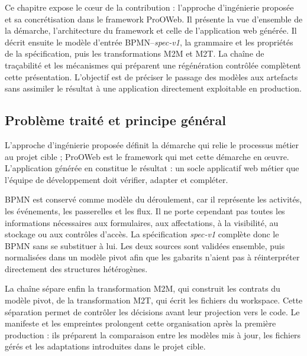 ﻿%
\label{chap:framework-prooweb}


Ce chapitre expose le cœur de la contribution : l'approche d'ingénierie proposée
et sa concrétisation dans le framework ProOWeb. Il présente la vue d'ensemble de
la démarche, l'architecture du framework et celle de l'application web générée.
Il décrit ensuite le modèle d'entrée BPMN--\textit{spec-v1}, la grammaire et les
propriétés de la spécification, puis les transformations M2M et M2T. La chaîne de
traçabilité et les mécanismes qui préparent une régénération contrôlée complètent
cette présentation. L'objectif est de préciser le passage des modèles aux
artefacts sans assimiler le résultat à une application directement exploitable
en production.

\label{sec:chap3-vue-ensemble}

\subsection{Problème traité et principe général}

L'approche d'ingénierie proposée définit la démarche qui relie le processus
métier au projet cible ; ProOWeb est le framework qui met cette démarche en
œuvre. L'application générée en constitue le résultat : un socle applicatif web
métier que l'équipe de développement doit vérifier, adapter et compléter.

BPMN est conservé comme modèle du déroulement, car il représente les activités,
les événements, les passerelles et les flux. Il ne porte cependant pas toutes
les informations nécessaires aux formulaires, aux affectations, à la visibilité,
au stockage ou aux contrôles d'accès. La spécification \textit{spec-v1} complète
donc le BPMN sans se substituer à lui. Les deux sources sont validées ensemble,
puis normalisées dans un modèle pivot afin que les gabarits n'aient pas à
réinterpréter directement des structures hétérogènes.

La chaîne sépare enfin la transformation M2M, qui construit les contrats du
modèle pivot, de la transformation M2T, qui écrit les fichiers du workspace.
Cette séparation permet de contrôler les décisions avant leur projection vers
le code. Le manifeste et les empreintes prolongent cette organisation après la
première production : ils préparent la comparaison entre les modèles mis à jour,
les fichiers gérés et les adaptations introduites dans le projet cible.

